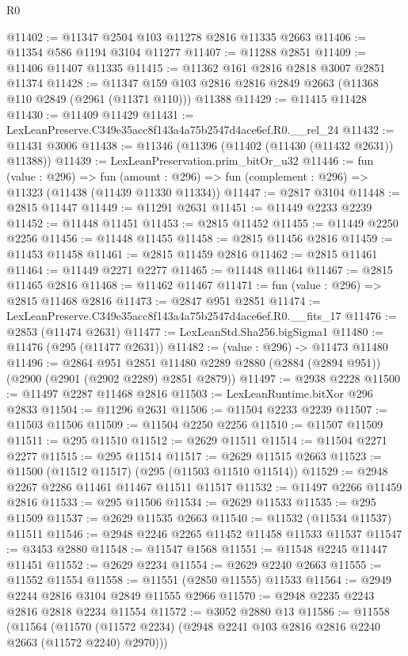 \begin{lexlean}{R0}
\begin{coremodule}
@11402 := @11347 @2504 @103 @11278 @2816 @11335 @2663
@11406 := @11354 @586 @1194 @3104 @11277
@11407 := @11288 @2851
@11409 := @11406 @11407 @11335
@11415 := @11362 @161 @2816 @2818 @3007 @2851 @11374
@11428 := @11347 @159 @103 @2816 @2816 @2849 @2663 (@11368 @110 @2849 (@2961 (@11371 @110))) @11388
@11429 := @11415 @11428
@11430 := @11409 @11429
@11431 := LexLeanPreserve.C349e35acc8f143a4a75b2547d4ace6ef.R0.__rel_24
@11432 := @11431 @3006
@11438 := @11346 (@11396 (@11402 (@11430 (@11432 @2631)) @11388))
@11439 := LexLeanPreservation.prim_bitOr_u32
@11446 := fun (value : @296) =>
  fun (amount : @296) => fun (complement : @296) => @11323 (@11438 (@11439 @11330 @11334))
@11447 := @2817 @3104
@11448 := @2815 @11447
@11449 := @11291 @2631
@11451 := @11449 @2233 @2239
@11452 := @11448 @11451
@11453 := @2815 @11452
@11455 := @11449 @2250 @2256
@11456 := @11448 @11455
@11458 := @2815 @11456 @2816
@11459 := @11453 @11458
@11461 := @2815 @11459 @2816
@11462 := @2815 @11461
@11464 := @11449 @2271 @2277
@11465 := @11448 @11464
@11467 := @2815 @11465 @2816
@11468 := @11462 @11467
@11471 := fun (value : @296) => @2815 @11468 @2816
@11473 := @2847 @951 @2851
@11474 := LexLeanPreserve.C349e35acc8f143a4a75b2547d4ace6ef.R0.__fits_17
@11476 := @2853 (@11474 @2631)
@11477 := LexLeanStd.Sha256.bigSigma1
@11480 := @11476 (@295 (@11477 @2631))
@11482 := (value : @296) -> @11473 @11480
@11496 := @2864
    @951
    @2851
    @11480
    @2289
    @2880
    (@2884 (@2894 @951))
    (@2900 (@2901 (@2902 @2289) @2851 @2879))
@11497 := @2938 @2228
@11500 := @11497 @2287 @11468 @2816
@11503 := LexLeanRuntime.bitXor @296 @2833
@11504 := @11296 @2631
@11506 := @11504 @2233 @2239
@11507 := @11503 @11506
@11509 := @11504 @2250 @2256
@11510 := @11507 @11509
@11511 := @295 @11510
@11512 := @2629 @11511
@11514 := @11504 @2271 @2277
@11515 := @295 @11514
@11517 := @2629 @11515 @2663
@11523 := @11500 (@11512 @11517) (@295 (@11503 @11510 @11514))
@11529 := @2948 @2267 @2286 @11461 @11467 @11511 @11517
@11532 := @11497 @2266 @11459 @2816
@11533 := @295 @11506
@11534 := @2629 @11533
@11535 := @295 @11509
@11537 := @2629 @11535 @2663
@11540 := @11532 (@11534 @11537) @11511
@11546 := @2948 @2246 @2265 @11452 @11458 @11533 @11537
@11547 := @3453 @2880
@11548 := @11547 @1568
@11551 := @11548 @2245 @11447 @11451
@11552 := @2629 @2234
@11554 := @2629 @2240 @2663
@11555 := @11552 @11554
@11558 := @11551 (@2850 @11555) @11533
@11564 := @2949 @2244 @2816 @3104 @2849 @11555 @2966
@11570 := @2948 @2235 @2243 @2816 @2818 @2234 @11554
@11572 := @3052 @2880 @13
@11586 := @11558
    (@11564 (@11570 (@11572 @2234) (@2948 @2241 @103 @2816 @2816 @2240 @2663 (@11572 @2240) @2970)))

\end{coremodule}
\end{lexlean}
